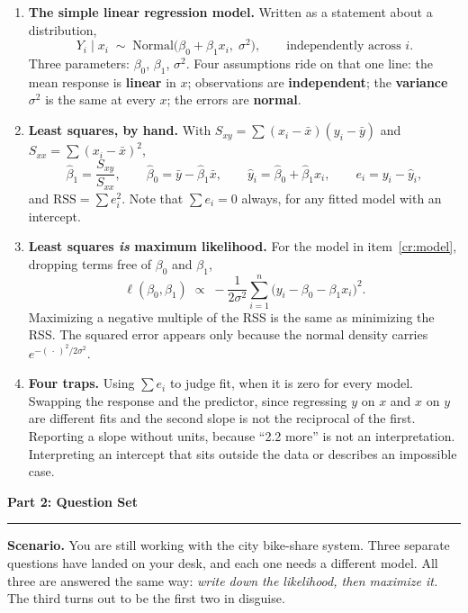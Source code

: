 \documentclass[11pt]{article}
\newcommand{\parttitle}[1]{%
  \par\medskip\noindent
  {\large\bfseries #1}\par
  \vspace{-.5em}\noindent\rule{\linewidth}{0.4pt}\par\smallskip}
\begin{document}
{\begin{enumerate}[label=\textbf{\arabic*.}, ref=\arabic*, wide=0pt, itemsep=.55em, topsep=.5em]
\item\label{cr:model} \textbf{The simple linear regression model.} Written as a statement about a
distribution,
\[
Y_i \mid x_i \;\sim\; \text{Normal}\big(\beta_0 + \beta_1 x_i,\; \sigma^2\big),
\qquad \text{independently across } i .
\]
Three parameters: $\beta_0$, $\beta_1$, $\sigma^2$. Four assumptions ride on that one line: the
mean response is \textbf{linear} in $x$; observations are \textbf{independent}; the
\textbf{variance} $\sigma^2$ is the same at every $x$; the errors are \textbf{normal}.

\item \textbf{Least squares, by hand.} With $S_{xy} = \sum (x_i-\bar{x})(y_i-\bar{y})$ and
$S_{xx} = \sum (x_i-\bar{x})^2$,
\[
\hat\beta_1 = \frac{S_{xy}}{S_{xx}},
\qquad
\hat\beta_0 = \bar{y} - \hat\beta_1\bar{x},
\qquad
\hat{y}_i = \hat\beta_0 + \hat\beta_1 x_i,
\qquad
e_i = y_i - \hat{y}_i ,
\]
and $\text{RSS} = \sum e_i^2$. Note that $\sum e_i = 0$ always, for any fitted model with an
intercept.

\item\label{cr:mle} \textbf{Least squares \emph{is} maximum likelihood.} For the model in
item~\ref{cr:model}, dropping terms free of $\beta_0$ and $\beta_1$,
\[
\ell(\beta_0,\beta_1) \;\propto\; -\frac{1}{2\sigma^2}\sum_{i=1}^{n}\big(y_i - \beta_0 - \beta_1 x_i\big)^2 .
\]
Maximizing a negative multiple of the RSS is the same as minimizing the RSS. The squared error
appears only because the normal density carries $e^{-(\,\cdot\,)^2/2\sigma^2}$.

\item \textbf{Four traps.} Using $\sum e_i$ to judge fit, when it is zero for every model.
Swapping the response and the predictor, since regressing $y$ on $x$ and $x$ on $y$ are different
fits and the second slope is not the reciprocal of the first. Reporting a slope without units,
because ``2.2 more'' is not an interpretation. Interpreting an intercept that sits outside the
data or describes an impossible case.

\end{enumerate}

}

\newpage

\parttitle{Part 2: Question Set}

\noindent\textbf{Scenario.} You are still working with the city bike-share system. Three separate
questions have landed on your desk, and each one needs a different model. All three are answered
the same way: \emph{write down the likelihood, then maximize it.} The third turns out to be the
first two in disguise.
\end{document}

